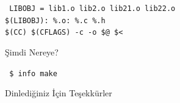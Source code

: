 \documentclass{beamer}
\begin{document}
\begin{frame}
    \texttt{%
        LIBOBJ = lib1.o lib2.o lib21.o lib22.o\\
        \$(LIBOBJ): \%.o: \%.c \%.h\\
        \hspace{10mm} \$(CC) \$(CFLAGS) -c -o \$@ \$<\\
    }

    \vspace{5mm}

    
\end{frame}
{
\begin{frame}
    
\end{frame}
}

\begin{frame}
    {Şimdi Nereye?}

    \texttt{%
        \$ info make} \\
        

    
\end{frame}

{
\begin{frame}
    {Dinlediğiniz İçin Teşekkürler}

    
\end{frame}
}
\end{document}
